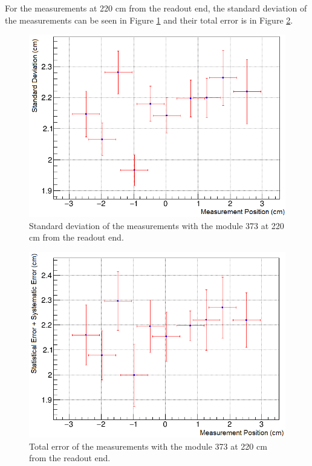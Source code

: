 \documentclass[a4paper]{article}\linespread{1.4}
\begin{document}
For the measurements at 220 cm from the readout end, the standard deviation of the measurements can be seen in Figure \ref{fig:73fs} and their total error is in Figure \ref{fig:73fe}.
\begin{figure}[h!] \hspace*{-0cm} \includegraphics[width=120mm,scale=2.0]{figures/73fs.png} \caption{Standard deviation of the measurements with the module 373 at 220 cm from the readout end.}  \label{fig:73fs}\end{figure}
\begin{figure}[h!] \hspace*{-0cm} \includegraphics[width=120mm,scale=2.0]{figures/73fe.png} \caption{Total error of the measurements with the module 373 at 220 cm from the readout end.}  \label{fig:73fe}\end{figure}
\end{document}
